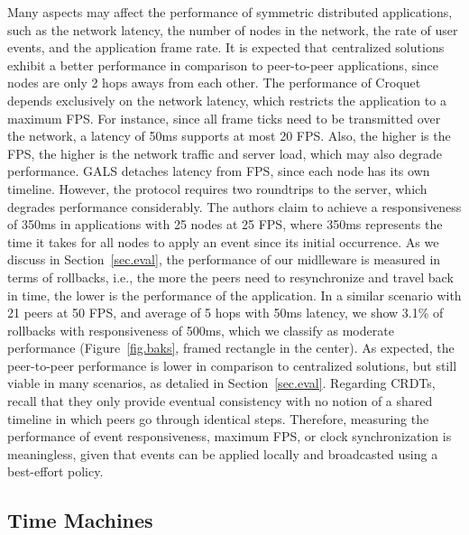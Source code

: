 \documentclass[12pt]{article}
\begin{document}
Many aspects may affect the performance of symmetric distributed applications,
such as
    the network latency,
    the number of nodes in the network,
    the rate of user events,
    and the application frame rate.
%
It is expected that centralized solutions exhibit a better performance in
comparison to peer-to-peer applications, since nodes are only 2 hops aways from
each other.
%
The performance of Croquet depends exclusively on the network latency, which
restricts the application to a maximum FPS.
For instance, since all frame ticks need to be transmitted over the network,
a latency of 50ms supports at most 20 FPS.
Also, the higher is the FPS, the higher is the network traffic and server load,
which may also degrade performance.
%
GALS detaches latency from FPS, since each node has its own timeline.
However, the protocol requires two roundtrips to the server, which degrades
performance considerably.
The authors claim to achieve a responsiveness of 350ms in applications with
25 nodes at 25 FPS, where 350ms represents the time it takes for all nodes to
apply an event since its initial occurrence.
%
As we discuss in Section~\ref{sec.eval}, the performance of our midlleware is
measured in terms of rollbacks, i.e., the more the peers need to resynchronize
and travel back in time, the lower is the performance of the application.
In a similar scenario with 21 peers at 50 FPS, and average of 5 hops with 50ms
latency, we show 3.1\% of rollbacks with responsiveness of 500ms, which we
classify as moderate performance (Figure~\ref{fig.baks}, framed rectangle in
the center).
As expected, the peer-to-peer performance is lower in comparison to centralized
solutions, but still viable in many scenarios, as detalied in
Section~\ref{sec.eval}.
%
Regarding CRDTs, recall that they only provide eventual consistency with no
notion of a shared timeline in which peers go through identical steps.
Therefore, measuring the performance of event responsiveness, maximum FPS, or
clock synchronization is meaningless, given that events can be applied locally
and broadcasted using a best-effort policy.

\subsection{Time Machines}
\end{document}
